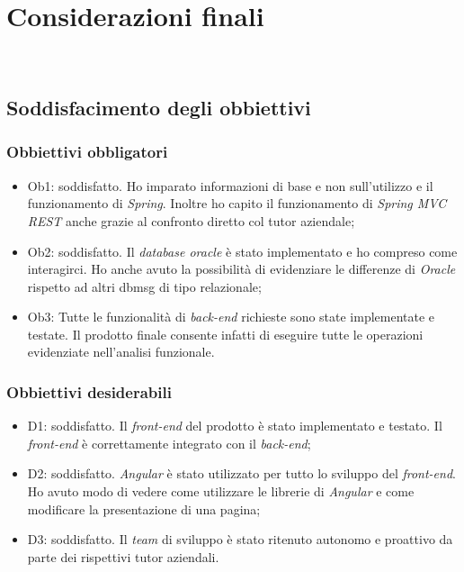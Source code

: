 
\chapter{Considerazioni finali}
\label{cap:considerazioni}

\\

\section{Soddisfacimento degli obbiettivi}
\subsection{Obbiettivi obbligatori}
\begin{itemize}
    \item Ob1: soddisfatto. Ho imparato informazioni di base e non sull'utilizzo e il funzionamento di \textit{Spring}. Inoltre ho capito il funzionamento di \textit{Spring MVC REST} anche grazie al confronto diretto col tutor aziendale;
    \item Ob2: soddisfatto. Il \textit{database oracle} è stato implementato e ho compreso come interagirci. Ho anche avuto la possibilità di evidenziare le differenze di \textit{Oracle} rispetto ad altri \gls{dbmsg} di tipo relazionale;
    \item Ob3: Tutte le funzionalità di \textit{back-end} richieste sono state implementate e testate. Il prodotto finale consente infatti di eseguire tutte le operazioni evidenziate nell'analisi funzionale.
\end{itemize}
\subsection{Obbiettivi desiderabili}
\begin{itemize}
    \item D1: soddisfatto. Il \textit{front-end} del prodotto è stato implementato e testato. Il \textit{front-end} è correttamente integrato con il \textit{back-end};
    \item D2: soddisfatto. \textit{Angular} è stato utilizzato per tutto lo sviluppo del \textit{front-end}. Ho avuto modo di vedere come utilizzare le librerie di \textit{Angular} e come modificare la presentazione di una pagina;
    \item D3: soddisfatto. Il \textit{team} di sviluppo è stato ritenuto autonomo e proattivo da parte dei rispettivi tutor aziendali.
\end{itemize}
